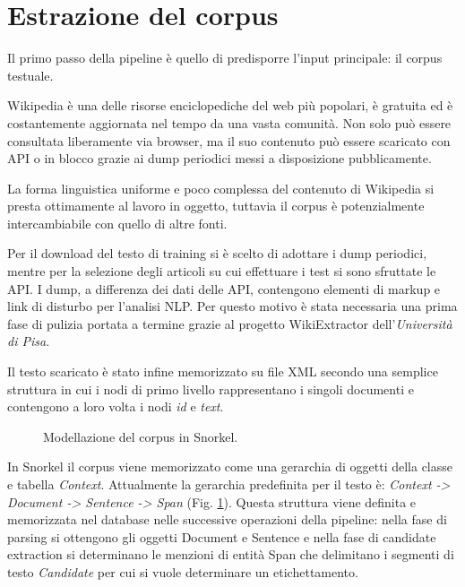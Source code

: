 \section{Estrazione del corpus}
\label{sec:methods:text_extraction}
Il primo passo della pipeline è quello di predisporre l'input principale: il corpus testuale.

Wikipedia è una delle risorse enciclopediche del web più popolari, è gratuita ed è costantemente aggiornata nel tempo da una vasta comunità. Non solo può essere consultata liberamente via browser, ma il suo contenuto può essere scaricato con API o in blocco grazie ai dump periodici messi a disposizione pubblicamente. 

La forma linguistica uniforme e poco complessa del contenuto di Wikipedia si presta ottimamente al lavoro in oggetto, tuttavia il corpus è potenzialmente intercambiabile con quello di altre fonti.

Per il download del testo di training si è scelto di adottare i dump periodici, mentre per la selezione degli articoli su cui effettuare i test si sono sfruttate le API. I dump, a differenza dei dati delle API, contengono elementi di markup e link di disturbo per l'analisi NLP. Per questo motivo è stata necessaria una prima fase di pulizia portata a termine grazie al progetto WikiExtractor dell'\textit{Università di Pisa}. 

Il testo scaricato è stato infine memorizzato su file XML secondo una semplice struttura in cui i nodi di primo livello rappresentano i singoli documenti e contengono a loro volta i nodi \textit{id} e \textit{text}.

\begin{figure}[htb]
	\caption{Modellazione del corpus in Snorkel.}
	\label{fig:methods:snorkel_struct}
\end{figure}

In Snorkel il corpus viene memorizzato come una gerarchia di oggetti della classe e tabella \textit{Context}. Attualmente la gerarchia predefinita per il testo è: \textit{Context -> Document -> Sentence -> Span} (Fig. \ref{fig:methods:snorkel_struct}).
Questa struttura viene definita e memorizzata nel database nelle successive operazioni della pipeline: nella fase di parsing si ottengono gli oggetti Document e Sentence e nella fase di candidate extraction si determinano le menzioni di entità Span che delimitano i segmenti di testo \textit{Candidate} per cui si vuole determinare un etichettamento.




